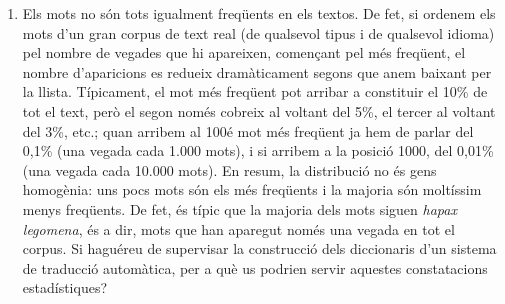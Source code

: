 \begin{enumerate}

\item Els mots no són tots igualment freqüents en els textos. De fet,
  si ordenem els mots d'un gran corpus de text real (de qualsevol
  tipus i de qualsevol idioma) pel nombre de vegades que hi apareixen,
  començant pel més freqüent, el nombre d'aparicions es redueix
  dramàticament segons que anem baixant per la llista. Típicament, el
  mot més freqüent pot arribar a constituir el 10\% de tot el text,
  però el segon només cobreix al voltant del 5\%, el tercer al voltant
  del 3\%, etc.; quan arribem al 100é mot més freqüent ja hem de
  parlar del 0,1\% (una vegada cada 1.000 mots), i si arribem a la
  posició 1000, del 0,01\% (una vegada cada 10.000 mots).  En resum,
  la distribució no és gens homogènia: uns pocs mots són els més
  freqüents i la majoria són moltíssim menys freqüents. De fet, és
  típic que la majoria dels mots siguen \emph{hapax legomena}, és a
  dir, mots que han aparegut només una vegada en tot el corpus. Si
  haguéreu de supervisar la construcció dels diccionaris d'un sistema
  de traducció automàtica, per a què us podrien servir aquestes
  constatacions estadístiques?


\end{enumerate}
